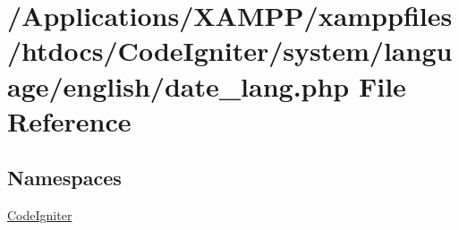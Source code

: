 \hypertarget{date__lang_8php}{}\section{/\+Applications/\+X\+A\+M\+P\+P/xamppfiles/htdocs/\+Code\+Igniter/system/language/english/date\+\_\+lang.php File Reference}
\label{date__lang_8php}
\subsection*{Namespaces}
\begin{DoxyCompactItemize}
\item 
 \mbox{\hyperlink{namespace_code_igniter}{Code\+Igniter}}
\end{DoxyCompactItemize}
